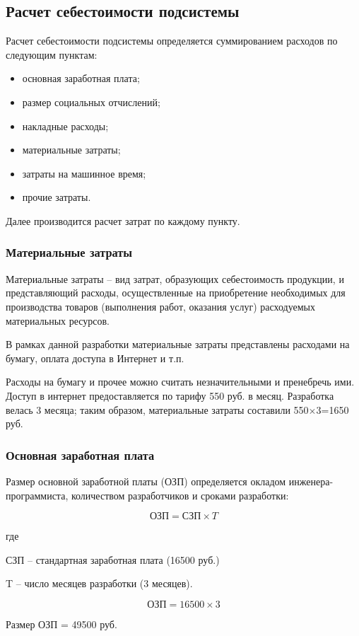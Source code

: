 \documentclass[a4paper]{extarticle}
\numberwithin{equation}{section}
\begin{document}
\subsection{Расчет себестоимости подсистемы}
Расчет себестоимости подсистемы определяется суммированием расходов по следующим пунктам:
\begin{itemize}
\item основная заработная плата;
\item размер социальных отчислений;
\item накладные расходы;
\item материальные затраты;
\item затраты на машинное время;
\item прочие затраты.
\end{itemize}
Далее производится расчет затрат по каждому пункту.\par

\subsubsection{Материальные затраты}
Материальные затраты – вид затрат, образующих себестоимость продукции, и представляющий расходы, осуществленные на приобретение необходимых для производства товаров (выполнения работ, оказания услуг) расходуемых материальных ресурсов.\par
В рамках данной разработки материальные затраты представлены расходами на бумагу, оплата доступа в Интернет и т.п.\par
Расходы на бумагу и прочее можно считать незначительными и пренебречь ими. Доступ в интернет предоставляется по тарифу 550 руб. в месяц. Разработка велась 3 месяца; таким образом, материальные затраты составили 550$\times$3=1650 руб.

\subsubsection{Основная заработная плата}
Размер основной заработной платы (ОЗП) определяется окладом инженера-программиста, количеством разработчиков и сроками разработки:\par
\begin{equation}
\label{form1}
	\text{ОЗП} = \text{СЗП}\times T
\end{equation}\par
где\par
СЗП – стандартная заработная плата (16500 руб.)\par
T – число месяцев разработки (3 месяцев).\par
\begin{equation}
\label{form2}
	\text{ОЗП} = 16500\times 3
\end{equation}\par
Размер  ОЗП = 49500 руб.
\end{document}
